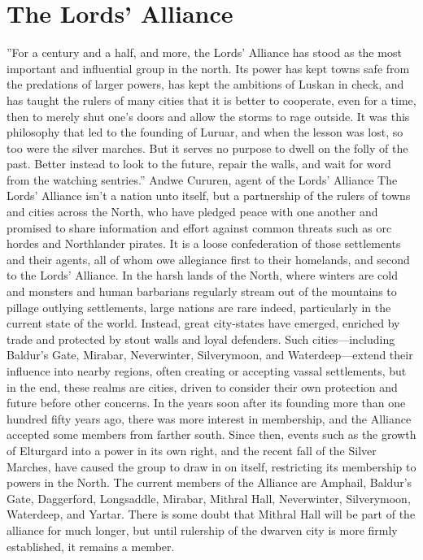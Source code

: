 \documentclass[10pt,a4paper,twoside,twocolumn,openany,bg=print,nodeprecatedcode]{dndbook}
\begin{document}
\section{The Lords' Alliance}
\DndQuote%
{}
{''For a century and a half, and more, the Lords' Alliance has stood as the most important and influential group in the north. Its power has kept towns safe from the predations of larger powers, has kept the ambitions of Luskan in check, and has taught the rulers of many cities that it is better to cooperate, even for a time, then to merely shut one's doors and allow the storms to rage outside. It was this philosophy that led to the founding of Luruar, and when the lesson was lost, so too were the silver marches. But it serves no purpose to dwell on the folly of the past. Better instead to look to the future, repair the walls, and wait for word from the watching sentries.''}
{Andwe Cururen, agent of the Lords' Alliance}
The Lords' Alliance isn't a nation unto itself, but a partnership of the rulers of towns and cities across the North, who have pledged peace with one another and promised to share information and effort against common threats such as orc hordes and Northlander pirates. It is a loose confederation of those settlements and their agents, all of whom owe allegiance first to their homelands, and second to the Lords' Alliance.
In the harsh lands of the North, where winters are cold and monsters and human barbarians regularly stream out of the mountains to pillage outlying settlements, large nations are rare indeed, particularly in the current state of the world. Instead, great city-states have emerged, enriched by trade and protected by stout walls and loyal defenders. Such cities—including Baldur's Gate, Mirabar, Neverwinter, Silverymoon, and Waterdeep—extend their influence into nearby regions, often creating or accepting vassal settlements, but in the end, these realms are cities, driven to consider their own protection and future before other concerns.
In the years soon after its founding more than one hundred fifty years ago, there was more interest in membership, and the Alliance accepted some members from farther south. Since then, events such as the growth of Elturgard into a power in its own right, and the recent fall of the Silver Marches, have caused the group to draw in on itself, restricting its membership to powers in the North. The current members of the Alliance are Amphail, Baldur's Gate, Daggerford, Longsaddle, Mirabar, Mithral Hall, Neverwinter, Silverymoon, Waterdeep, and Yartar. There is some doubt that Mithral Hall will be part of the alliance for much longer, but until rulership of the dwarven city is more firmly established, it remains a member.
\end{document}
